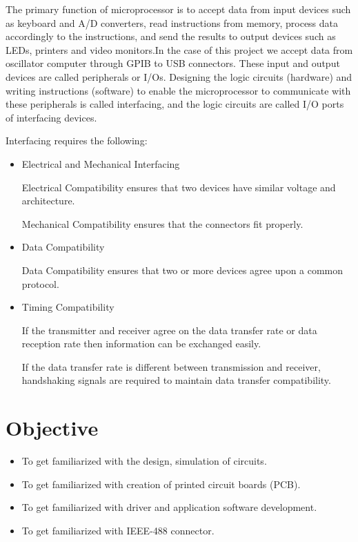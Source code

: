 \documentclass[12pt]{article}
\begin{document}
The primary function of microprocessor is to accept data from input devices such as keyboard and A/D converters, read instructions from memory, process data accordingly to the instructions, and send the results to output devices such as LEDs, printers and video monitors.In the case of this project we accept data from oscillator  computer through GPIB to USB connectors.    These input and output devices are called peripherals or I/Os. Designing the logic circuits (hardware) and writing instructions (software) to enable the microprocessor to communicate with these peripherals is called interfacing, and the logic circuits are called I/O ports of interfacing devices.\par
Interfacing requires the following:
\begin{itemize}
\item Electrical and Mechanical Interfacing\par
Electrical Compatibility ensures that two devices have similar voltage and architecture.\par
Mechanical Compatibility ensures that the connectors fit properly.
\item Data Compatibility\par
Data Compatibility ensures that two or more devices agree upon a common protocol.
\item Timing Compatibility\par
If the transmitter and receiver agree on the data transfer rate or data reception rate then information can be exchanged easily.\par
If the data transfer rate is different between transmission and receiver, handshaking signals are required to maintain data transfer compatibility.
\end{itemize}



\newpage

\section{Objective}
\begin{itemize}
\item To get familiarized  with the design, simulation of circuits.
\item To get familiarized  with creation of printed circuit boards (PCB).
\item To get familiarized  with driver and application software development.
\item To get familiarized  with IEEE-488 connector. 
\end{itemize}
\newpage
\end{document}
